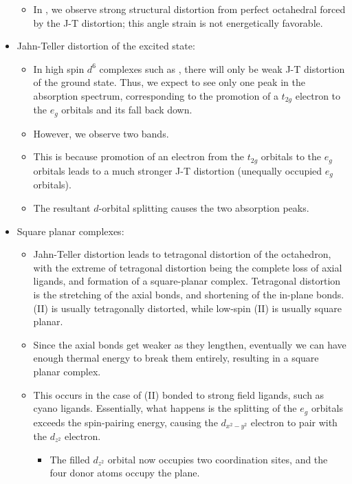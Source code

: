 \documentclass[../notes.tex]{subfiles}
\begin{document}
\begin{itemize}
\begin{itemize}
\begin{itemize}
        \end{itemize}
        \item In , we observe strong structural distortion from perfect octahedral forced by the J-T distortion; this angle strain is not energetically favorable.
    \end{itemize}
    \item Jahn-Teller distortion of the excited state:
    \begin{itemize}
        \item In high spin $d^6$ complexes such as , there will only be weak J-T distortion of the ground state. Thus, we expect to see only one peak in the absorption spectrum, corresponding to the promotion of a $t_{2g}$ electron to the $e_g$ orbitals and its fall back down.
        \item However, we observe two bands.
        \item This is because promotion of an electron from the $t_{2g}$ orbitals to the $e_g$ orbitals leads to a much stronger J-T distortion (unequally occupied $e_g$ orbitals).
        \item The resultant $d$-orbital splitting causes the two absorption peaks.
    \end{itemize}
    \item Square planar complexes:
    \begin{itemize}
        \item Jahn-Teller distortion leads to tetragonal distortion of the octahedron, with the extreme of tetragonal distortion being the complete loss of axial ligands, and formation of a square-planar complex. Tetragonal distortion is the stretching of the axial  bonds, and shortening of the in-plane bonds. (II) is usually tetragonally distorted, while low-spin (II) is usually square planar.
        \item Since the axial bonds get weaker as they lengthen, eventually we can have enough thermal energy to break them entirely, resulting in a square planar complex.
        \item This occurs in the case of (II) bonded to strong field ligands, such as cyano ligands. Essentially, what happens is the splitting of the $e_g$ orbitals exceeds the spin-pairing energy, causing the $d_{x^2-y^2}$ electron to pair with the $d_{z^2}$ electron.
        \begin{itemize}
            \item The filled $d_{z^2}$ orbital now occupies two coordination sites, and the four donor atoms occupy the plane.

\end{itemize}
\end{itemize}
\end{itemize}
\end{document}
